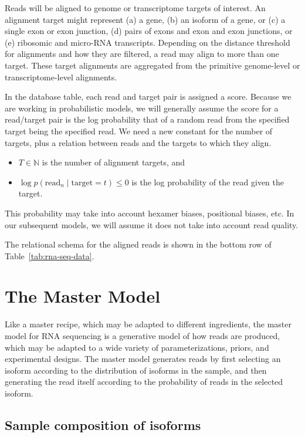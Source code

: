 \documentclass[11pt]{report}
\begin{document}
Reads will be aligned to genome or transcriptome targets of interest.
An alignment target might represent (a) a gene, (b) an isoform of a
gene, or (c) a single exon or exon junction, (d) pairs of exons and
exon and exon junctions, or (e) ribosomic and micro-RNA transcripts.
Depending on the distance threshold for alignments and how they are
filtered, a read may align to more than one target. These target
alignments are aggregated from the primitive genome-level or
transcriptome-level alignments.

In the database table, each read and target pair is assigned a score.
Because we are working in probabilistic models, we will generally
assume the score for a read/target pair is the log probability that
of a random read from the specified target being the specified read.
We need a new constant for the number of targets, plus a relation
between reads and the targets to which they align.
%
\begin{itemize}
\item $T \in \mathbb{N}$ is the number of alignment targets, and
\item $\log p(\textrm{read}_n \mid \textrm{target} = t) \leq 0$
  is the log probability of the read given the target.
\end{itemize}
This probability may take into account hexamer biases, positional
biases, etc.  In our subsequent models, we will assume it does not
take into account read quality.  

The relational schema for the aligned reads is shown in the bottom row
of Table~\ref{tab:rna-seq-data}.


\chapter{The Master Model}

Like a master recipe, which may be adapted to different ingredients,
the master model for RNA sequencing is a generative model of how reads
are produced, which may be adapted to a wide variety of
parameterizations, priors, and experimental designs.  The master model
generates reads by first selecting an isoform according to the
distribution of isoforms in the sample, and then generating the read
itself according to the probability of reads in the selected isoform.

\section{Sample composition of isoforms}
\end{document}
